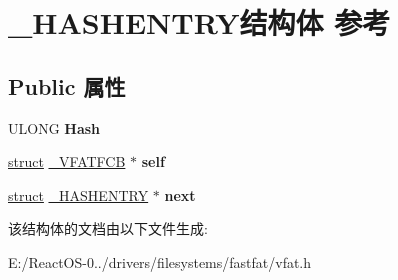 \hypertarget{struct___h_a_s_h_e_n_t_r_y}{}\section{\+\_\+\+H\+A\+S\+H\+E\+N\+T\+R\+Y结构体 参考}
\label{struct___h_a_s_h_e_n_t_r_y}
\subsection*{Public 属性}
\begin{DoxyCompactItemize}
\item 
\mbox{\label{struct___h_a_s_h_e_n_t_r_y_ae2c96c1487f69a3a39e1918f7ac55f8e}} 
U\+L\+O\+NG {\bfseries Hash}
\item 
\mbox{\label{struct___h_a_s_h_e_n_t_r_y_ad68c8468d960e774590486378d329739}} 
\hyperlink{interfacestruct}{struct} \hyperlink{struct___v_f_a_t_f_c_b}{\+\_\+\+V\+F\+A\+T\+F\+CB} $\ast$ {\bfseries self}
\item 
\mbox{\label{struct___h_a_s_h_e_n_t_r_y_aa1ed60095cd25ed426ac4a7a5c687d0e}} 
\hyperlink{interfacestruct}{struct} \hyperlink{struct___h_a_s_h_e_n_t_r_y}{\+\_\+\+H\+A\+S\+H\+E\+N\+T\+RY} $\ast$ {\bfseries next}
\end{DoxyCompactItemize}


该结构体的文档由以下文件生成\+:\begin{DoxyCompactItemize}
\item 
E\+:/\+React\+O\+S-\/0../drivers/filesystems/fastfat/vfat.\+h\end{DoxyCompactItemize}
